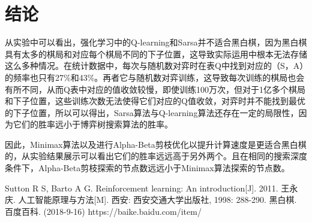 \documentclass{article}
\begin{document}
\section{结论}
从实验中可以看出，强化学习中的Q-learning和Sarsa并不适合黑白棋，因为黑白棋具有太多的棋局和对应每个棋局不同的下子位置，这导致实际运用中根本无法存储这么多种情况。在统计数据中，每次与随机数对弈时在表Q中找到对应的（S，A）的频率也只有27\%和43\%。再者它与随机数对弈训练，这导致每次训练的棋局也会有所不同，从而Q表中对应的值收敛较慢，即使训练100万次，但对于1亿多个棋局和下子位置，这些训练次数无法使得它们对应的Q值收敛，对弈时并不能找到最优的下子位置，所以可以得出，Sarsa算法与Q-learning算法还存在一定的局限性，因为它们的胜率远小于博弈树搜索算法的胜率。
\par
因此，Minimax算法以及进行Alpha-Beta剪枝优化以提升计算速度是更适合黑白棋的，从实验结果展示可以看出它们的胜率远远高于另外两个。且在相同的搜索深度条件下，Alpha-Beta剪枝探索的节点数远远小于Minimax算法探索的节点数。

\begin{thebibliography}{10}
 Sutton R S, Barto A G. Reinforcement learning: An introduction[J]. 2011.
 王永庆. 人工智能原理与方法[M]. 西安: 西安交通大学出版社,
1998: 288-290.
 黑白棋. 百度百科. (2018-9-16) https://baike.baidu.com/item/%
\end{thebibliography}
\end{document}

